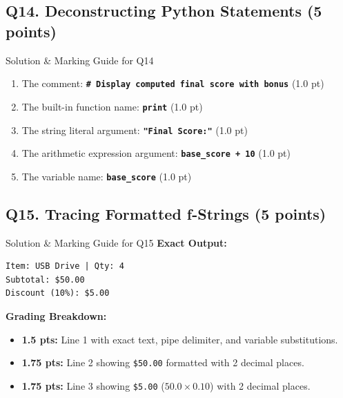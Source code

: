 \documentclass[11pt,a4paper]{article}
\begin{document}
\subsection*{Q14. Deconstructing Python Statements (5 points)}
\begin{solbox}{Solution \& Marking Guide for Q14}
\begin{enumerate}[label=\alph*., noitemsep]
  \item The comment: \textbf{\texttt{\# Display computed final score with bonus}} (1.0 pt)
  \item The built-in function name: \textbf{\texttt{print}} (1.0 pt)
  \item The string literal argument: \textbf{\texttt{"Final Score:"}} (1.0 pt)
  \item The arithmetic expression argument: \textbf{\texttt{base\_score + 10}} (1.0 pt)
  \item The variable name: \textbf{\texttt{base\_score}} (1.0 pt)
\end{enumerate}
\end{solbox}

\vspace{0.2cm}

\subsection*{Q15. Tracing Formatted f-Strings (5 points)}
\begin{solbox}{Solution \& Marking Guide for Q15}
\textbf{Exact Output:}
\begin{lstlisting}
Item: USB Drive | Qty: 4
Subtotal: $50.00
Discount (10%): $5.00
\end{lstlisting}
\textbf{Grading Breakdown:}
\begin{itemize}[noitemsep]
  \item \textbf{1.5 pts:} Line 1 with exact text, pipe delimiter, and variable substitutions.
  \item \textbf{1.75 pts:} Line 2 showing \texttt{\$50.00} formatted with 2 decimal places.
  \item \textbf{1.75 pts:} Line 3 showing \texttt{\$5.00} ($50.0 \times 0.10$) with 2 decimal places.
\end{itemize}
\end{solbox}

\newpage

\end{document}
